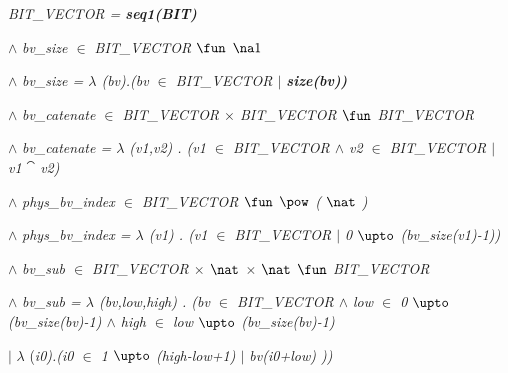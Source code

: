 \hspace*{0.20in}\it BIT\_VECTOR \rm = \bf seq1\rm (\it BIT\rm ) 

\hspace*{0.15in}

\hspace*{0.20in} $\land$  \it bv\_size  $\in$  \it BIT\_VECTOR  $\fun$   $ \na1 $  

\hspace*{0.20in} $\land$  \it bv\_size \rm =  $\lambda$ \rm (\it bv\rm )\rm .\rm (\it bv  $\in$  \it BIT\_VECTOR  $\mid$  \bf size\rm (\it bv\rm )\rm ) 

\hspace*{0.20in}

\hspace*{0.20in} $\land$  \it bv\_catenate  $\in$  \it BIT\_VECTOR  $\times$  \it BIT\_VECTOR  $\fun$  \it BIT\_VECTOR 

\hspace*{0.20in} $\land$  \it bv\_catenate \rm =  $\lambda$ \rm (\it v1\rm ,\it v2\rm ) \rm . \rm (\it v1  $\in$  \it BIT\_VECTOR  $\land$  \it v2 $\in$  \it BIT\_VECTOR  $\mid$  \it v1 $\cat$ \it v2\rm ) 

\vspace*{4mm}
\hspace*{0.20in} $\land$  \it phys\_bv\_index  $\in$  \it BIT\_VECTOR  $\fun$   $\pow$ \rm ( $\nat$ \rm )

\hspace*{0.20in} $\land$  \it phys\_bv\_index \rm =  $\lambda$ \rm (\it v1\rm ) \rm . \rm (\it v1  $\in$  \it BIT\_VECTOR  $\mid$  \rm 0 $\upto$ \rm (\it bv\_size\rm (\it v1\rm )\rm -\rm 1\rm )\rm ) 

\hspace*{0.15in}

\hspace*{0.20in} $\land$  \it bv\_sub  $\in$  \it BIT\_VECTOR  $\times$   $\nat$   $\times$   $\nat$   $\fun$  \it BIT\_VECTOR 

\hspace*{0.20in} $\land$  \it bv\_sub \rm =  $\lambda$ \rm (\it bv\rm ,\it low\rm ,\it high\rm ) \rm . \rm (\it bv  $\in$  \it BIT\_VECTOR  $\land$  \it low $\in$  \rm 0 $\upto$ \rm (\it bv\_size\rm (\it bv\rm )\rm -\rm 1\rm )  $\land$  \it high $\in$ \it low $\upto$ \rm (\it bv\_size\rm (\it bv\rm )\rm -\rm 1\rm )

\hspace*{1.80in} $\mid$   $\lambda$ \rm (\it i0\rm )\rm .\rm (\it i0 $\in$  \rm 1 $\upto$ \rm (\it high\rm -\it low\rm +\rm 1\rm )  $\mid$  \it bv\rm (\it i0\rm +\it low\rm ) \rm )\rm ) 


